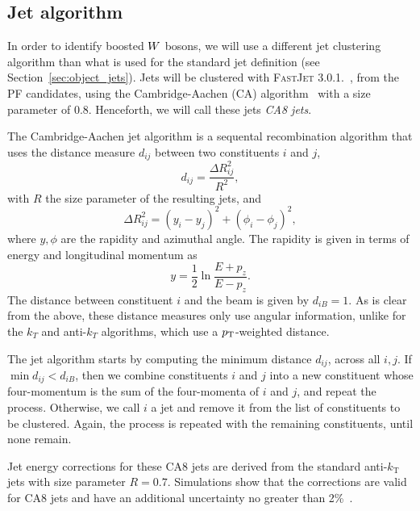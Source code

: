 \subsection{Jet algorithm}

In order to identify boosted $W$ bosons,  we will use a different jet clustering algorithm
than what is used for the standard jet definition (see Section~\ref{sec:object_jets}). 
Jets will be clustered with \textsc{FastJet 3.0.1.}~\cite{Cacciari:2011ma}, from the PF candidates,
using the Cambridge-Aachen (CA) algorithm~\cite{Dokshitzer:1997in} with a size parameter of 0.8.
Henceforth, we will call these jets \textit{CA8 jets}. 

\begin{cajet} \theoremstyle{definition}
The Cambridge-Aachen jet algorithm is a sequental recombination algorithm that uses the
distance measure $d_{ij}$ between two constituents $i$ and $j$,
\begin{equation}
d_{ij} = \frac{\Delta R_{ij}^2}{R^2}, \label{eq:CA_distance}
\end{equation}
with $R$ the size parameter of the resulting jets, and
\begin{equation}
\Delta R_{ij}^2 = (y_i - y_j)^2 + (\phi_i - \phi_j)^2 ,
\label{eq:DeltaR_jet_algo}
\end{equation}
where $y, \phi$ are the rapidity and azimuthal angle. The rapidity is given in terms
of
energy and longitudinal momentum as
\begin{equation}
  y = \frac{1}{2} \ln{\frac{ E + p_z }{ E - p_z }} .
\end{equation}
The distance between constituent $i$ and the beam is given by $d_{iB} = 1$.
As is clear from the above, these distance measures only use angular information, unlike for the
$k_T$ and anti-$k_T$ algorithms, which use a $p_{\mathrm{T}}$-weighted distance. 

The jet algorithm starts by computing the minimum distance $d_{ij}$, across all $i,j$. If $\min
d_{ij} < d_{iB}$, then we combine constituents $i$ and $j$ into a new constituent whose
four-momentum is the sum of the four-momenta of $i$ and $j$, and repeat the process. Otherwise, we
call $i$ a jet and remove it from the list of constituents to be clustered. Again, the process is
repeated with the remaining constituents, until none remain.
\end{cajet}

Jet energy corrections for these CA8 jets are derived from the standard anti-$k_\textrm{T}$ jets
with size parameter $R=0.7$. Simulations show that the corrections are valid for CA8 jets and
have an additional uncertainty no greater than 2\%~\cite{CMS-PAS-JME-13-007}.  


